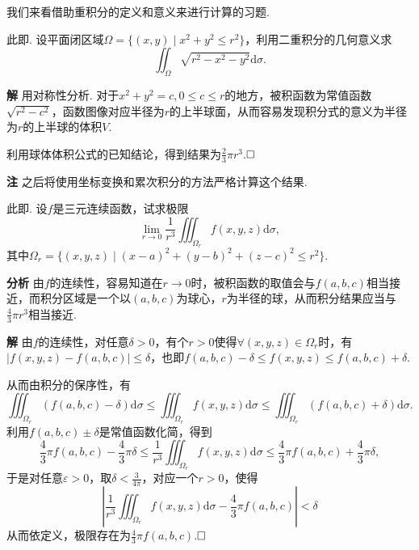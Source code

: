 \documentclass{ctexart}
\newenvironment{custom}[1]{\par\noindent \textbf{#1}\quad}{\par\vspace{1em}}
\begin{document}
我们来看借助重积分的定义和意义来进行计算的习题.

\begin{example}
此即\cite[第八章第一节习题1]{JC}. 设平面闭区域$\Omega=\{(x,y)\mid x^{2}+y^{2}\leqslant r^{2}\}$，利用二重积分的几何意义求
$$\iint_{\Omega}{\sqrt{r^{2}-x^{2}-y^{2}}\mathrm{d}\sigma}.$$
\end{example}

\begin{custom}{解}
用对称性分析. 对于$x^{2}+y^{2}=c,0\leqslant c\leqslant r$的地方，被积函数为常值函数$\sqrt{r^{2}-c^{2}}$，函数图像对应半径为$r$的上半球面，从而容易发现积分式的意义为半径为$r$的上半球的体积$V$.

利用球体体积公式的已知结论，得到结果为$\frac{2}{3}\pi r^{3}$.$\hfill{\square}$
\end{custom}

\begin{custom}{注}
之后将使用坐标变换和累次积分的方法严格计算这个结果.
\end{custom}

\begin{example}
此即\cite[第八章第一节习题5]{JC}. 设$f$是三元连续函数，试求极限
$$\lim\limits_{r\to 0}{\frac{1}{r^{3}}\iiint_{\Omega_{r}}{f(x,y,z)\mathrm{d}\sigma}},$$
其中$\Omega_{r}=\{(x,y,z)\mid (x-a)^{2}+(y-b)^{2}+(z-c)^{2}\leqslant r^{2}\}$.
\end{example}

\begin{custom}{分析}
由$f$的连续性，容易知道在$r\to 0$时，被积函数的取值会与$f(a,b,c)$相当接近，而积分区域是一个以$(a,b,c)$为球心，$r$为半径的球，从而积分结果应当与$\frac{4}{3}\pi r^{3}$相当接近.
\end{custom}

\begin{custom}{解}
由$f$的连续性，对任意$\delta>0$，有个$r>0$使得$\forall (x,y,z)\in\Omega_{r}$时，有$|f(x,y,z)-f(a,b,c)|\leqslant \delta$，也即$f(a,b,c)-\delta\leqslant f(x,y,z)\leqslant f(a,b,c)+\delta$.

从而由积分的保序性，有
$$\iiint_{\Omega_{r}}{(f(a,b,c)-\delta)\mathrm{d}\sigma}\leqslant\iiint_{\Omega_{r}}{f(x,y,z)\mathrm{d}\sigma}\leqslant\iiint_{\Omega_{r}}{(f(a,b,c)+\delta)\mathrm{d}\sigma}.$$
利用$f(a,b,c)\pm \delta$是常值函数化简，得到
$$\frac{4}{3}\pi f(a,b,c)-\frac{4}{3}\pi\delta\leqslant \frac{1}{r^{3}}\iiint_{\Omega_{r}}{f(x,y,z)\mathrm{d}\sigma}\leqslant \frac{4}{3}\pi f(a,b,c)+\frac{4}{3}\pi\delta,$$
于是对任意$\varepsilon>0$，取$\delta<\frac{3}{4\pi}$，对应一个$r>0$，使得
$$\left|\frac{1}{r^{3}}\iiint_{\Omega_{r}}{f(x,y,z)\mathrm{d}\sigma}-\frac{4}{3}\pi f(a,b,c)\right|<\delta$$
从而依定义，极限存在为$\frac{4}{3}\pi f(a,b,c)$.$\hfill{\square}$
\end{custom}
\end{document}

